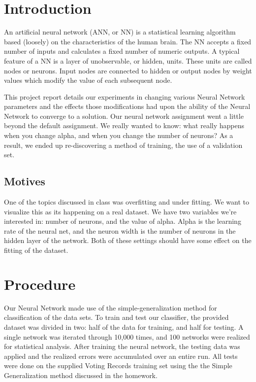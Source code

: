 \documentclass[11pt,letterpaper]{article}
\begin{document}
\maketitle

\section{Introduction}
An artificial neural network (ANN, or NN) is a statistical learning algorithm based (loosely) on the characteristics of the human brain.
The NN accepts a fixed number of inputs and calculates a fixed number of numeric outputs.
A typical feature of a NN is a layer of unobservable, or hidden, units. 
These units are called nodes or neurons.
Input nodes are connected to hidden or output nodes by weight values which modify the value of each subsequent node.

This project report details our experiments in changing various Neural Network parameters and
the effects those modifications had upon the ability of the Neural Network to converge to a solution.
Our neural network assignment went a little beyond the default assignment.
We really wanted to know: what really happens when you change alpha, and when you change the number of neurons?
As a result, we ended up re-discovering a method of training, the use of a validation set.

\subsection{Motives}
One of the topics discussed in class was overfitting and under fitting.
We want to visualize this as its happening on a real dataset.
We have two variables we're interested in: number of neurons, and the value of alpha.
Alpha is the learning rate of the neural net, and the neuron width is the number of neurons in the hidden layer of the network.
Both of these settings should have some effect on the fitting of the dataset.

\section{Procedure}
Our Neural Network made use of the simple-generalization method for classification of the data sets.
To train and test our classifier, the provided dataset was divided in two: half of the data for training, and half for testing.
A single network was iterated through 10,000 times, and 100 networks were realized for statistical analysis.
After training the neural network, the testing data was applied and the realized errors were accumulated over an entire run.
All tests were done on the supplied Voting Records training set using the the Simple Generalization method discussed in the homework. 
\end{document}
